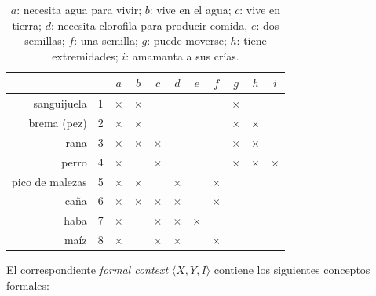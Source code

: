 \documentclass[12pt,oneside,letterpaper]{book}
\newcommand{\eng}[1]{\textit{#1}\xspace}			%
\theoremstyle{definition}
\begin{document}
\begin{table}[h!]
	\centering
	\begin{tabular}{|r|c||c|c|c|c|c|c|c|c|c|}
		\hline
		\multicolumn{2}{|c||}{}	& 	$a$ 		& 	$b$ 		& 	$c$ 		& 	$d$ 	 & 	$e$ 	 & 	$f$ 	 & 	$g$ 	 & 	$h$		 & 	$i$		 \\ \hline 
		\hline
		sanguijuela 			& 1 & 	$\times$ 	& 	$\times$ 	& 		 		& 		 	 & 		 	 & 		 	 & 	$\times$ & 			 & 			 \\ \hline
		brema (pez) 			& 2 & 	$\times$ 	& 	$\times$ 	& 		 		& 		 	 & 		 	 & 		 	 & 	$\times$ & 	$\times$ & 			 \\ \hline
		rana 					& 3 & 	$\times$ 	& 	$\times$ 	& 	$\times$ 	& 		 	 & 		 	 & 		 	 & 	$\times$ & 	$\times$ & 			 \\ \hline
		perro  					& 4 & 	$\times$ 	& 	        	& 	$\times$ 	& 		 	 & 		 	 & 		 	 & 	$\times$ & 	$\times$ & 	$\times$ \\ \hline
		pico de malezas			& 5 & 	$\times$ 	& 	$\times$ 	& 		 		& 	$\times$ & 		 	 & 	$\times$ & 		 	 & 			 & 			 \\ \hline
		caña 	 				& 6 & 	$\times$ 	& 	$\times$ 	& 	$\times$ 	& 	$\times$ & 		 	 & 	$\times$ & 		 	 & 			 & 			 \\ \hline
		haba 					& 7 & 	$\times$ 	& 	 			& 	$\times$ 	& 	$\times$ & 	$\times$ & 		 	 & 		 	 & 			 & 			 \\ \hline
		maíz	 				& 8 & 	$\times$ 	& 			 	& 	$\times$ 	& 	$\times$ & 		 	 & 	$\times$ & 		 	 & 			 & 			 \\ \hline
	\end{tabular}
	\caption{$a$: necesita agua para vivir; $b$: vive en el agua; $c$: vive en tierra; $d$: necesita clorofila para producir comida, $e$: dos semillas; $f$: una semilla; $g$: puede moverse; $h$: tiene extremidades; $i$: amamanta a sus crías.}
	\label{tbl:concept_lattice_full_example}
\end{table}

El correspondiente \eng{formal context} $\langle X,Y,I \rangle$ contiene los siguientes conceptos formales:
\end{document}
